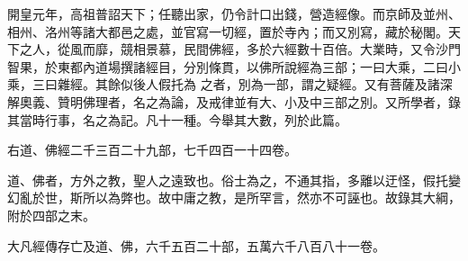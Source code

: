 \begin{pinyinscope}
 開皇元年，高祖普詔天下；任聽出家，仍令計口出錢，營造經像。而京師及並州、相州、洛州等諸大都邑之處，並官寫一切經，置於寺內；而又別寫，藏於秘閣。天下之人，從風而靡，競相景慕，民間佛經，多於六經數十百倍。大業時，又令沙門智果，於東都內道場撰諸經目，分別條貫，以佛所說經為三部；一曰大乘，二曰小乘，三曰雜經。其餘似後人假托為
 之者，別為一部，謂之疑經。又有菩薩及諸深解奧義、贊明佛理者，名之為論，及戒律並有大、小及中三部之別。又所學者，錄其當時行事，名之為記。凡十一種。今舉其大數，列於此篇。



 右道、佛經二千三百二十九部，七千四百一十四卷。



 道、佛者，方外之教，聖人之遠致也。俗士為之，不通其指，多離以迂怪，假托變幻亂於世，斯所以為弊也。故中庸之教，是所罕言，然亦不可誣也。故錄其大綱，附於四部之末。



 大凡經傳存亡及道、佛，六千五百二十部，五萬六千八百八十一卷。



\end{pinyinscope}